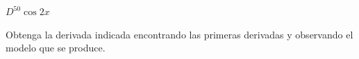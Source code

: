 \item $D^{50} \cos 2x$
\par
Obtenga la derivada indicada encontrando las primeras derivadas y observando el modelo que se produce.
